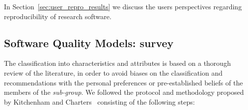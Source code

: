 In Section~\ref{sec:user_repro_results} we discuss the users perspectives regarding reproducibility of research software.

\subsection{Software Quality Models: survey}
\label{subsec:sqm_survey}

The classification into characteristics and attributes is based on a thorough review of the literature, in order to avoid biases on the classification and recommendations with the personal preferences or pre-established beliefs of the members of the \textit{sub-group}. We followed the protocol and methodology proposed by Kitchenham and Charters~\cite{keele2007guidelines} consisting of the following steps:

